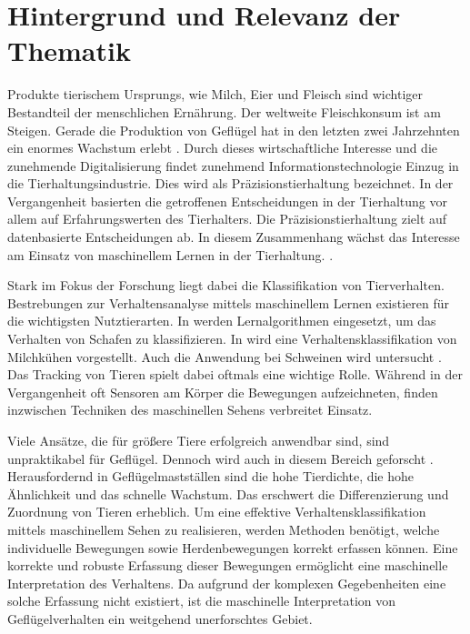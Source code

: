 \section{Hintergrund und Relevanz der Thematik} \label{sec:Hintergrund}
Produkte tierischem Ursprungs, wie Milch, Eier und Fleisch sind wichtiger Bestandteil der menschlichen Ernährung. Der weltweite Fleischkonsum ist am Steigen. Gerade die Produktion von Geflügel hat in den letzten zwei Jahrzehnten ein enormes Wachstum erlebt \cite{StatistischesBundesamt.20200212}. Durch dieses wirtschaftliche Interesse und die zunehmende Digitalisierung findet zunehmend Informationstechnologie Einzug in die Tierhaltungsindustrie. Dies wird als Präzisionstierhaltung bezeichnet. In der Vergangenheit basierten die getroffenen Entscheidungen in der Tierhaltung vor allem auf Erfahrungswerten des Tierhalters. Die Präzisionstierhaltung zielt auf datenbasierte Entscheidungen ab. In diesem Zusammenhang wächst das Interesse am Einsatz von maschinellem Lernen in der Tierhaltung. \cite{Garcia.2020}.\par

Stark im Fokus der Forschung liegt dabei die Klassifikation von Tierverhalten. Bestrebungen zur Verhaltensanalyse mittels maschinellem Lernen existieren für die wichtigsten Nutztierarten. In \cite{VazquezDiosdado.2019} werden Lernalgorithmen eingesetzt, um das Verhalten von Schafen zu klassifizieren. In \cite{VazquezDiosdado.2015} wird eine Verhaltensklassifikation von Milchkühen vorgestellt. Auch die Anwendung bei Schweinen wird untersucht \cite{Tran.2023}. Das Tracking von Tieren spielt dabei oftmals eine wichtige Rolle. Während in der Vergangenheit oft Sensoren am Körper die Bewegungen aufzeichneten, finden inzwischen Techniken des maschinellen Sehens verbreitet Einsatz.\par

Viele Ansätze, die für größere Tiere erfolgreich anwendbar sind, sind unpraktikabel für Geflügel. Dennoch wird auch in diesem Bereich geforscht \cite{Chen.2023, Gonzalez.2020, Nasirahmadi.2020}. Herausfordernd in Geflügelmastställen sind die hohe Tierdichte, die hohe Ähnlichkeit und das schnelle Wachstum. Das erschwert die Differenzierung und Zuordnung von Tieren erheblich. Um eine effektive Verhaltensklassifikation mittels maschinellem Sehen zu realisieren, werden Methoden benötigt, welche individuelle Bewegungen sowie Herdenbewegungen korrekt erfassen können. Eine korrekte und robuste Erfassung dieser Bewegungen ermöglicht eine maschinelle Interpretation des Verhaltens. Da aufgrund der komplexen Gegebenheiten eine solche Erfassung nicht existiert, ist die maschinelle Interpretation von Geflügelverhalten ein weitgehend unerforschtes Gebiet. \par

